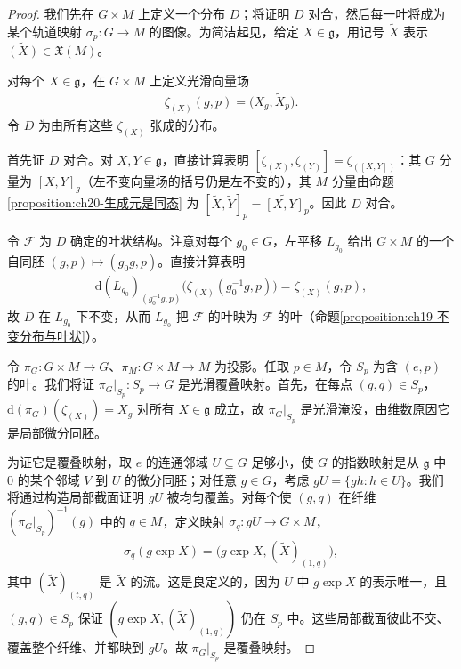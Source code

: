 \documentclass[../../main.tex]{subfiles}
\begin{document}
\begin{proof}
我们先在 $G\times M$ 上定义一个分布 $D$；将证明 $D$ 对合，然后每一叶将成为某个轨道映射 $\sigma_p\colon G\to M$ 的图像。为简洁起见，给定 $X\in\mathfrak g$，用记号 $\widetilde X$ 表示 $\widetilde{(X)}\in\mathfrak X(M)$。

对每个 $X\in\mathfrak g$，在 $G\times M$ 上定义光滑向量场
\begin{align*}
\zeta_{(X)}(g,p)=\bigl(X_g,\widetilde X_p\bigr).
\end{align*}
令 $D$ 为由所有这些 $\zeta_{(X)}$ 张成的分布。

首先证 $D$ 对合。对 $X,Y\in\mathfrak g$，直接计算表明 $[\zeta_{(X)},\zeta_{(Y)}]=\zeta_{([X,Y])}$：其 $G$ 分量为 $[X,Y]_g$（左不变向量场的括号仍是左不变的），其 $M$ 分量由命题\cref{proposition:ch20-生成元是同态} 为 $[\widetilde X,\widetilde Y]_p=\widetilde{[X,Y]}_p$。因此 $D$ 对合。

令 $\mathscr F$ 为 $D$ 确定的叶状结构。注意对每个 $g_0\in G$，左平移 $L_{g_0}$ 给出 $G\times M$ 的一个自同胚 $(g,p)\mapsto(g_0g,p)$。直接计算表明
\begin{align*}
\mathrm{d}(L_{g_0})_{(g_0^{-1}g,p)}\bigl(\zeta_{(X)}(g_0^{-1}g,p)\bigr)=\zeta_{(X)}(g,p),
\end{align*}
故 $D$ 在 $L_{g_0}$ 下不变，从而 $L_{g_0}$ 把 $\mathscr F$ 的叶映为 $\mathscr F$ 的叶（命题\cref{proposition:ch19-不变分布与叶状}）。

令 $\pi_G\colon G\times M\to G$、$\pi_M\colon G\times M\to M$ 为投影。任取 $p\in M$，令 $S_p$ 为含 $(e,p)$ 的叶。我们将证 $\pi_G|_{S_p}\colon S_p\to G$ 是光滑覆叠映射。首先，在每点 $(g,q)\in S_p$，$\mathrm{d}(\pi_G)(\zeta_{(X)})=X_g$ 对所有 $X\in\mathfrak g$ 成立，故 $\pi_G|_{S_p}$ 是光滑淹没，由维数原因它是局部微分同胚。

为证它是覆叠映射，取 $e$ 的连通邻域 $U\subseteq G$ 足够小，使 $G$ 的指数映射是从 $\mathfrak g$ 中 $0$ 的某个邻域 $V$ 到 $U$ 的微分同胚；对任意 $g\in G$，考虑 $gU=\{gh\colon h\in U\}$。我们将通过构造局部截面证明 $gU$ 被均匀覆盖。对每个使 $(g,q)$ 在纤维 $(\pi_G|_{S_p})^{-1}(g)$ 中的 $q\in M$，定义映射 $\sigma_q\colon gU\to G\times M$，
\begin{align*}
\sigma_q(g\exp X)=\bigl(g\exp X,(\widetilde X)_{(1,q)}\bigr),
\end{align*}
其中 $(\widetilde X)_{(t,q)}$ 是 $\widetilde X$ 的流。这是良定义的，因为 $U$ 中 $g\exp X$ 的表示唯一，且 $(g,q)\in S_p$ 保证 $(g\exp X,(\widetilde X)_{(1,q)})$ 仍在 $S_p$ 中。这些局部截面彼此不交、覆盖整个纤维、并都映到 $gU$。故 $\pi_G|_{S_p}$ 是覆叠映射。


\end{proof}
\end{document}
